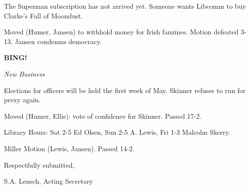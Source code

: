 \documentclass[12pt]{article}
\newcommand{\bing}{{\bf BING!} }
\newcommand{\goto}[1]{\bing \vskip 12pt \centerline{{\em{#1}}}}
\begin{document}
The Superman subscription has not arrived yet. Someone wants Libcomm to buy Clarke's Fall of Moondust.

Moved (Humer, Jansen) to withhold money for Irish fanzines. Motion defeated 3-13. Jansen condemns democracy.

\goto{New Business}

Elections for officers will be held the first week of May. Skinner refuses to run for prexy again.

Moved (Humer, Ellis): vote of confidence for Skinner. Passed 17-2.

Library Hours: Sat 2-5 Ed Olsen, Sun 2-5 A. Lewis, Fri 1-3 Malcolm Skerry.

Miller Motion (Lewis, Jansen). Passed 14-2.

\vspace{12pt}

\centerline{Respectfully submitted,}
\centerline{S.A. Lensch, Acting Secretary}
\end{document}
